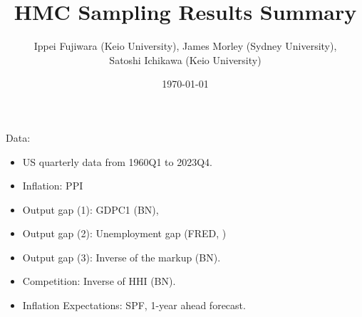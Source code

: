 \documentclass{beamer}
\title{HMC Sampling Results Summary}
\author{Ippei Fujiwara (Keio University), James Morley (Sydney University), \\ Satoshi Ichikawa (Keio University)}
\date{\today}
\begin{document}
\begin{frame}
  \titlepage
\end{frame}

\begin{frame}
  Data: 
  \begin{itemize}
    \item US quarterly data from 1960Q1 to 2023Q4.
    \item Inflation: PPI
    \item Output gap (1): GDPC1 (BN),
    \item Output gap (2): Unemployment gap (FRED, )
    \item Output gap (3): Inverse of the markup (BN).
    \item Competition: Inverse of HHI (BN).
    \item Inflation Expectations: SPF, 1-year ahead forecast.
  \end{itemize}
\end{frame}
\end{document}
